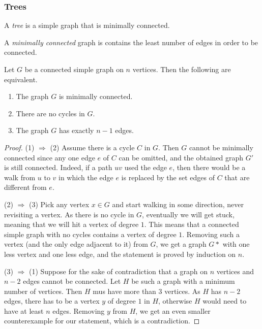 \subsubsection{Trees}\label{tree}

\noindent A \emph{tree} is a simple graph that is minimally connected.

\label{minimallyconnected}
A \emph{minimally connected} graph is contains the least number of edges in order to be connected.

\begin{lemma}
Let $G$ be a connected simple graph on $n$ vertices. Then the following are equivalent.
\begin{enumerate}
  \item The graph $G$ is minimally connected.
  \item There are no cycles in $G$.
  \item The graph $G$ has exactly $n-1$ edges.
\end{enumerate}
\end{lemma}

\begin{proof}
(1) $\Rightarrow$ (2) Assume there is a cycle $C$ in $G$. Then $G$ cannot be minimally connected since any one edge $e$ of $C$ can be omitted,
and the obtained graph $G'$ is still connected. Indeed, if a path $uv$ used the edge $e$, then there would be a walk from $u$ to $v$ in which
the edge $e$ is replaced by the set edges of $C$ that are different from $e$.

(2) $\Rightarrow$ (3) Pick any vertex $x \in G$ and start walking in some direction, never revisiting a vertex. As there is no cycle in $G$, eventually
we will get stuck, meaning that we will hit a vertex of degree $1$. This means that a connected simple graph with no cycles contains a vertex of degree $1$.
Removing such a vertex (and the only edge adjacent to it) from $G$, we get a graph $G*$ with one less vertex and one less edge, and the statement is proved by
induction on $n$.

(3) $\Rightarrow$ (1) Suppose for the sake of contradiction that a graph on $n$ vertices and $n - 2$ edges cannot be connected. Let $H$ be such a graph with a minimum number of vertices.
Then $H$ mus have more than $3$ vertices. As $H$ has $n-2$ edges, there has to be a vertex $y$ of degree $1$ in $H$, otherwise $H$ would need to have at least $n$ edges. Removing $y$ from
$H$, we get an even smaller counterexample for our statement, which is a contradiction.
\end{proof}

